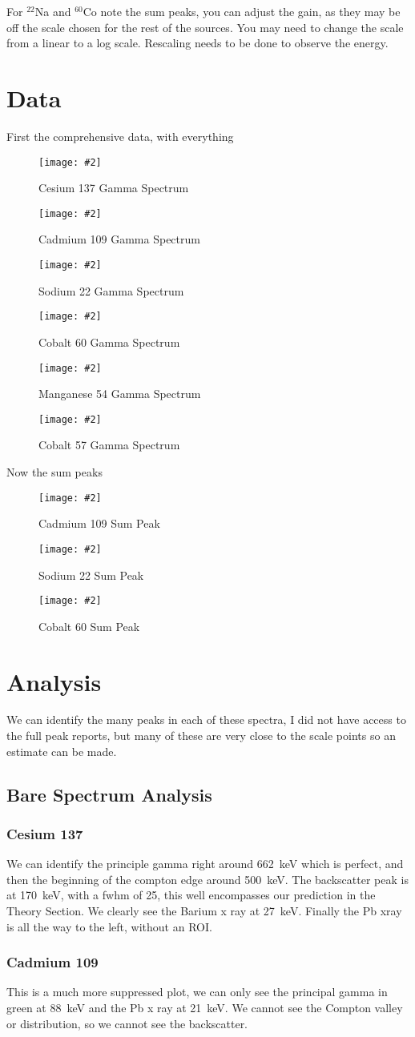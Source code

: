 \documentclass[letterpaper,12pt]{article}
\newcommand{\labfig}[4]{
  \begin{figure}[H]
    \centering
    \texttt{[image: \#2]}
    \caption{#3}
    \label{#4}
  \end{figure}}
\begin{document}
For $^{22}$Na and $^{60}$Co note the sum peaks, you can adjust the gain, as they may be off the scale chosen for the rest of the sources. You may need to change the scale from a linear to a log scale. Rescaling needs to be done to observe the energy. 
\section{Data}
First the comprehensive data, with everything
\labfig{13.5}{Cs_137_Plot}{Cesium 137 Gamma Spectrum}{cs137}
\labfig{13.5}{Cd_109_Plot}{Cadmium 109 Gamma Spectrum}{cd109}
\labfig{13.5}{Na_22_Plot}{Sodium 22 Gamma Spectrum}{na22}
\labfig{13.5}{Co_60_Plot}{Cobalt 60 Gamma Spectrum}{co60}
\labfig{13.5}{Mn_54_Plot}{Manganese 54 Gamma Spectrum}{mn54}
\labfig{13.5}{Co_57_Plot}{Cobalt 57 Gamma Spectrum}{co57}
Now the sum peaks
\labfig{13.5}{Cd_109_Sum_Peaks}{Cadmium 109 Sum Peak}{sumcd109}
\labfig{13.5}{Na_22_Sum_Peak}{Sodium 22 Sum Peak}{sumna22}
\labfig{13.5}{Co_60_Sum_Peaks}{Cobalt 60 Sum Peak}{sumco60}
\section{Analysis}
We can identify the many peaks in each of these spectra, I did not have access to the full peak reports, but many of these are very close to the scale points so an estimate can be made.

\subsection{Bare Spectrum Analysis}
\subsubsection{Cesium 137}
We can identify the principle gamma right around \SI{662}{\keV} which is perfect, and then the beginning of the compton edge around \SI{500}{\keV}. The backscatter peak is at \SI{170}{\keV}, with a fwhm of 25, this well encompasses our prediction in the Theory Section. We clearly see the Barium x ray at \SI{27}{\keV}. Finally the Pb xray is all the way to the left, without an ROI.  

\subsubsection{Cadmium 109}
This is a much more suppressed plot, we can only see the principal gamma in green at \SI{88}{\keV} and the Pb x ray at \SI{21}{\keV}. We cannot see the Compton valley or distribution, so we cannot see the backscatter.
\end{document}
